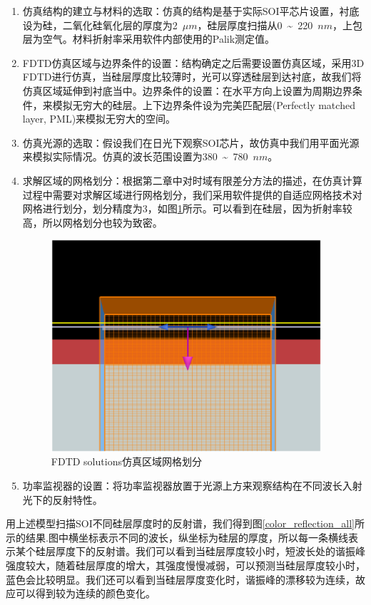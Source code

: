 \begin{enumerate}[(1)]
	\item 
	仿真结构的建立与材料的选取：仿真的结构是基于实际SOI平芯片设置，衬底设为硅，二氧化硅氧化层的厚度为2~$\mu m$，硅层厚度扫描从0~\~{}~220~$nm$，上包层为空气。材料折射率采用软件内部使用的Palik测定值。
	\item 
	FDTD仿真区域与边界条件的设置：结构确定之后需要设置仿真区域，采用3D FDTD进行仿真，当硅层厚度比较薄时，光可以穿透硅层到达衬底，故我们将仿真区域延伸到衬底当中。边界条件的设置：在水平方向上设置为周期边界条件，来模拟无穷大的硅层。上下边界条件设为完美匹配层(Perfectly matched layer, PML)来模拟无穷大的空间。
	\item 
	仿真光源的选取：假设我们在日光下观察SOI芯片，故仿真中我们用平面光源来模拟实际情况。仿真的波长范围设置为380~\~{}~780~$nm$。
	\item 
	求解区域的网格划分：根据第二章中对时域有限差分方法的描述，在仿真计算过程中需要对求解区域进行网格划分，我们采用软件提供的自适应网格技术对网格进行划分，划分精度为3，如图\ref{color_mesh}所示。可以看到在硅层，因为折射率较高，所以网格划分也较为致密。
	\begin{figure}[htb]
		\centering
		\includegraphics[width=10cm]{./Pictures/color_mesh.jpg}
		\captionsetup{justification=centering}
		\caption{FDTD solutions仿真区域网格划分}
		\label{color_mesh}
	\end{figure}
	\item 
	功率监视器的设置：将功率监视器放置于光源上方来观察结构在不同波长入射光下的反射特性。
\end{enumerate}

用上述模型扫描SOI不同硅层厚度时的反射谱，我们得到图\ref{color_reflection_all}所示的结果.图中横坐标表示不同的波长，纵坐标为硅层的厚度，所以每一条横线表示某个硅层厚度下的反射谱。我们可以看到当硅层厚度较小时，短波长处的谐振峰强度较大，随着硅层厚度的增大，其强度慢慢减弱，可以预测当硅层厚度较小时，蓝色会比较明显。我们还可以看到当硅层厚度变化时，谐振峰的漂移较为连续，故应可以得到较为连续的颜色变化。

